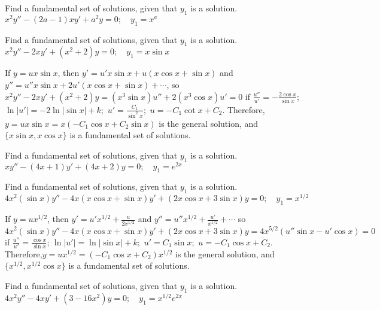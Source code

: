 \documentclass{ximera}
\begin{document}
\begin{problem}\label{exer:5.6.23}
Find a
fundamental set of solutions, given that $y_1$ is a solution. $x^2y''-(2a-1)xy'+a^2y=0;   \quad y_1=x^a$
\end{problem}

\begin{problem}\label{exer:5.6.24}
Find a
fundamental set of solutions, given that $y_1$ is a solution. $x^2y''-2xy'+(x^2+2)y=0;   \quad y_1=x \sin x$

\begin{solution}
    If $y=ux\sin x$, then $y'=u'x\sin x+u(x\cos x+\sin x)$ and
$y''=u''x\sin x+2u'(x\cos x+\sin x)+\cdots$, so
$x^2y''-2xy'+(x^2+2)y=(x^3\sin x)u''+2(x^3\cos x)u'=0$ if
$\frac{u''}{ u'}=-\frac{2\cos x}{\sin x}$;\ $\ln|u'|=-2\ln|\sin
x|+k$;\ $u'=\frac{C_1}{\sin^2x}$;\ $u=-C_1\cot x+C_2$. Therefore,
$y=ux\sin x=x(-C_1\cos x+C_2\sin x)$ is the general solution, and
$\{x\sin x,x\cos x\}$ is a fundamental set of solutions.
\end{solution}
\end{problem}

\begin{problem}\label{exer:5.6.25}
Find a
fundamental set of solutions, given that $y_1$ is a solution. $xy''-(4x+1)y'+(4x+2)y=0;  \quad y_1=e^{2x}$
\end{problem}

\begin{problem}\label{exer:5.6.26}
Find a
fundamental set of solutions, given that $y_1$ is a solution. $4x^2(\sin x)y''-4x(x\cos x+\sin x)y'+(2x\cos x+3\sin x)y=0;  \quad
y_1=x^{1/2}$

\begin{solution}
    If $y=ux^{1/2}$, then $y'=u'x^{1/2}+\frac{u}{2x^{1/2}}$ and
$y''=u''x^{1/2}+\frac{u'}{ x^{1/2}}+\cdots$ so $4x^2(\sin
x)y''-4x(x\cos x+\sin x)y'+(2x\cos x+3\sin x)y=4x^{5/2}(u''\sin
x-u'\cos x)=0$ if $\frac{u''}{ u'}=\frac{\cos x}{\sin x}$;\;
$\ln|u'|=\ln|\sin x|+k$;\ $u'=C_1\sin x$;\ $u=-C_1\cos x+C_2$.
Therefore,$y=ux^{1/2}=(-C_1\cos x+C_2)x^{1/2}$ is the general
solution, and $\{x^{1/2},x^{1/2}\cos x\}$ is a fundamental set of
solutions.
\end{solution}
\end{problem}

\begin{problem}\label{exer:5.6.27}
Find a
fundamental set of solutions, given that $y_1$ is a solution. $4x^2y''-4xy'+(3-16x^2)y=0;  \quad y_1=x^{1/2}e^{2x}$
\end{problem}
\end{document}
